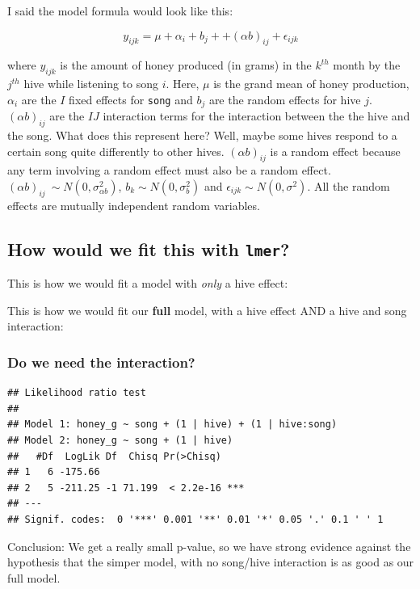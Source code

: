 \documentclass[
  openany]{book}
\begin{document}
I said the model formula would look like this:

\[y_{ijk} = \mu + \alpha_i + b_{j} + + (\alpha b)_{ij} + \epsilon_{ijk}\]

where \(y_{ijk}\) is the amount of honey produced (in grams) in the \(k^{th}\) month by the \(j^{th}\) hive while listening to song \(i\). Here, \(\mu\) is the grand mean of honey production, \(\alpha_i\) are the \(I\) fixed effects for \texttt{song} and \(b_j\) are the random effects for hive \(j\). \((\alpha b)_{ij}\) are the \(IJ\) interaction terms for the interaction between the the hive and the song. What does this represent here? Well, maybe some hives respond to a certain song quite differently to other hives. \((\alpha b)_{ij}\) is a random effect because any term involving a random effect must also be a random effect. \((\alpha b)_{ij} ~ \sim N(0, \sigma^2_{\alpha b})\), \(b_k \sim N(0, \sigma_b^2)\) and \(\epsilon_{ijk} \sim N(0, \sigma^2)\). All the random effects are mutually independent random variables.

\hypertarget{how-would-we-fit-this-with-lmer}{%
\subsection{\texorpdfstring{How would we fit this with \texttt{lmer}?}{How would we fit this with lmer?}}\label{how-would-we-fit-this-with-lmer}}

This is how we would fit a model with \emph{only} a hive effect:

This is how we would fit our \textbf{full} model, with a hive effect AND a hive and song interaction:

\hypertarget{do-we-need-the-interaction}{%
\subsubsection{Do we need the interaction?}\label{do-we-need-the-interaction}}

\begin{verbatim}
## Likelihood ratio test
## 
## Model 1: honey_g ~ song + (1 | hive) + (1 | hive:song)
## Model 2: honey_g ~ song + (1 | hive)
##   #Df  LogLik Df  Chisq Pr(>Chisq)    
## 1   6 -175.66                         
## 2   5 -211.25 -1 71.199  < 2.2e-16 ***
## ---
## Signif. codes:  0 '***' 0.001 '**' 0.01 '*' 0.05 '.' 0.1 ' ' 1
\end{verbatim}

Conclusion: We get a really small p-value, so we have strong evidence against the hypothesis that the simper model, with no song/hive interaction is as good as our full model.
\end{document}
